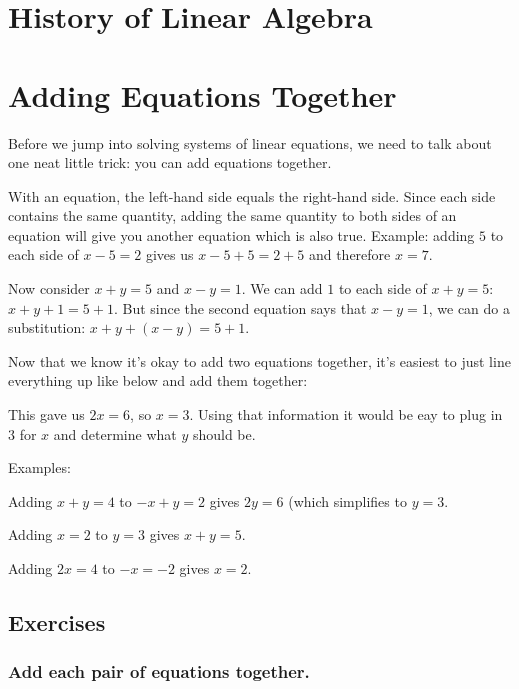 \documentclass[a4paper,twoside,12pt]{memoir}  %
\begin{document}
\section{History of Linear Algebra}

\section{Adding Equations Together}
Before we jump into solving systems of linear equations, we need to talk about one neat little trick: you can add equations together.

With an equation, the left-hand side equals the right-hand side. Since each side contains the same quantity, adding the same quantity to both sides of an equation will give you another equation which is also true.
Example: adding $5$ to each side of $x - 5 = 2$ gives us $x - 5 + 5 = 2 + 5$ and therefore $x = 7$.

Now consider $x + y = 5$ and $x - y = 1$. We can add $1$ to each side of $x + y =5$: $x + y + 1 = 5 + 1$.
But since the second equation says that $x - y = 1$, we can do a substitution: $x + y + (x - y) = 5 + 1$.


Now that we know it's okay to add two equations together, it's easiest to just line everything up like below and add them together:


This gave us $2x = 6$, so $x = 3$. Using that information it would be eay to plug in $3$ for $x$ and determine what $y$ should be.

Examples:
\begin{list}{}
\item Adding $x + y = 4$ to $-x + y = 2$ gives $2y = 6$ (which simplifies to $y=3$.
\item Adding $x = 2$ to $y=3$ gives $x + y = 5$.
\item Adding $2x = 4$ to $-x = -2$ gives $x = 2$.
\end{list}

\subsection{Exercises}
\subsubsection{Add each pair of equations together.}
\end{document}
